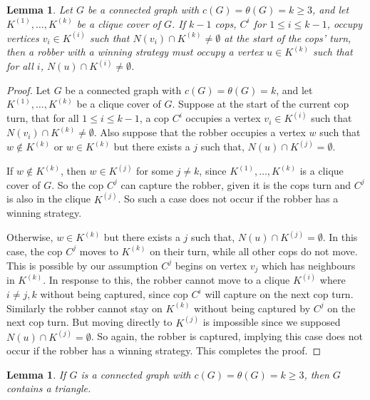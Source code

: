 \documentclass[12pt]{amsart}
\newtheorem{lemma}[theorem]{Lemma}
\theoremstyle{definition}
\begin{document}
\begin{lemma}\label{Lemma: Robber First Move}
    Let $G$ be a connected graph with $c(G) = \theta(G) = k\geq 3$, and let $K^{(1)}, \dots, K^{(k)}$ be a clique cover of $G$.
    If $k-1$ cops, $C^i$ for $1\leq i \leq k-1$, occupy vertices $v_i \in K^{(i)}$ such that $N(v_i) \cap K^{(k)} \neq \emptyset$ at the start of the cops' turn,
    then a robber with a winning strategy must occupy a vertex $u \in K^{(k)}$ such that for all $i$, $N(u) \cap K^{(i)} \neq \emptyset$.
\end{lemma}


\begin{proof}
    Let $G$ be a connected graph with $c(G) = \theta(G) = k$, and let $K^{(1)}, \dots, K^{(k)}$ be a clique cover of $G$.
    Suppose at the start of the current cop turn, that for all $1\leq i \leq k-1$,
    a cop $C^i$ occupies a vertex $v_i \in K^{(i)}$ such that $N(v_i) \cap K^{(k)} \neq \emptyset$.
    Also suppose that the robber occupies a vertex $w$ such that $w \notin K^{(k)}$
    or $w \in K^{(k)}$ but there exists a $j$ such that, $N(u) \cap K^{(j)} =  \emptyset$.

    If $w \notin K^{(k)}$, then $w \in K^{(j)}$ for some $j \neq k$, since  $K^{(1)}, \dots, K^{(k)}$ is a clique cover of $G$.
    So the cop $C^j$ can capture the robber, given it is the cops turn and $C^j$ is also in the clique $K^{(j)}$.
    So such a case does not occur if the robber has a winning strategy.

    Otherwise, $w \in K^{(k)}$ but there exists a $j$ such that, $N(u) \cap K^{(j)} = \emptyset$.
    In this case, the cop $C^j$ moves to $K^{(k)}$ on their turn, while all other cops do not move.
    This is possible by our assumption $C^j$ begins on vertex $v_j$ which has neighbours in $K^{(k)}$.
    In response to this, the robber cannot move to a clique $K^{(i)}$ where $i\neq j,k$ without being captured, since cop $C^i$ will capture on the next cop turn.
    Similarly the robber cannot stay on $K^{(k)}$ without being captured by $C^j$ on the next cop turn.
    But moving directly to $K^{(j)}$ is impossible since we supposed $N(u) \cap K^{(j)} = \emptyset$.
    So again, the robber is captured, implying this case does not occur if the robber has a winning strategy.
    This completes the proof.
\end{proof}


\begin{lemma}\label{Lemma: There is a triangle}
    If $G$ is a connected graph with $c(G) = \theta(G) = k\geq 3$, then $G$ contains a triangle.
\end{lemma}
\end{document}
